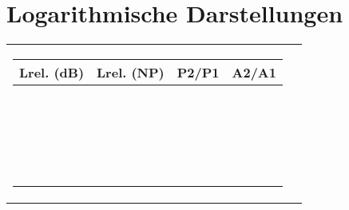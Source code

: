 \section{Logarithmische Darstellungen}

\begin{tabular}{ll}
\parbox{7cm}{ 
    \scriptsize
    \renewcommand{\arraystretch}{1.2}
    \begin{tabular}{|c|c|c|c|}
    \hline
    \textbf{Lrel. (dB)} & \textbf{Lrel. (NP)} & \textbf{P2/P1} & \textbf{A2/A1} \\ \hline
    $100.000$ & $11.513$ & $10^{10}$ & $10^5$ \\ \hline
    $90.000$ & $10.362$ & $10^9$ & $31622.777$ \\ \hline
    $80.000$ & $9.210$ & $10^8$ & $10^4$ \\ \hline
    $70.000$ & $8.059$ & $10^7$ & $3162.278$ \\ \hline
    $60.000$ & $6.908$ & $10^6$ & $10^3$ \\ \hline
    $50.000$ & $5.756$ & $10^5$ & $316.228$ \\ \hline
    $40.000$ & $4.605$ & $10^4$ & $10^2$ \\ \hline
    $30.000$ & $3.454$ & $10^3$ & $31.623$ \\ \hline
    \textbf{$20.000$} & $2.303$ & \textbf{$10^2$} & \textbf{$10.000$} \\ \hline
    $19.085$ & $2.197$ & $81.000$ & $9.000$ \\ \hline
    $19.000$ & $2.187$ & $79.433$ & $8.913$ \\ \hline
    $18.062$ & $2.079$ & $64.000$ & $8.000$ \\ \hline
    $18.000$ & $2.072$ & $63.096$ & $7.943$ \\ \hline
    $17.000$ & $1.957$ & $50.119$ & $7.079$ \\ \hline
    $16.902$ & $1.946$ & $49.000$ & $7.000$ \\ \hline
    $16.000$ & $1.842$ & $39.811$ & $6.310$ \\ \hline
    $15.563$ & $1.792$ & $36.000$ & $6.000$ \\ \hline
    $15.000$ & $1.727$ & $31.623$ & $5.623$ \\ \hline
    $14.000$ & $1.612$ & $25.119$ & $5.012$ \\ \hline
    \textbf{$13.979$} & $1.609$ & \textbf{$25.000$} & \textbf{$5.000$} \\ \hline
    $13.000$ & $1.497$ & $19.953$ & $4.467$ \\ \hline

\end{tabular}}
\end{tabular}
